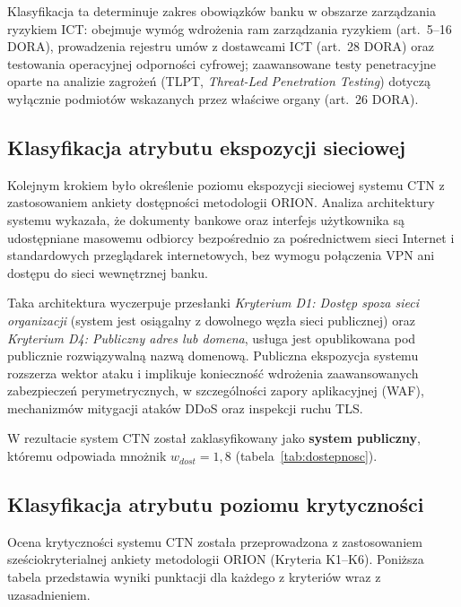 Klasyfikacja ta determinuje zakres obowiązków banku w obszarze zarządzania ryzykiem ICT: obejmuje wymóg wdrożenia ram zarządzania ryzykiem (art.~5--16 DORA), prowadzenia rejestru umów z dostawcami ICT (art.~28 DORA) oraz testowania operacyjnej odporności cyfrowej; zaawansowane testy penetracyjne oparte na analizie zagrożeń (TLPT, \textit{Threat-Led Penetration Testing}) dotyczą wyłącznie podmiotów wskazanych przez właściwe organy (art.~26 DORA).

\subsection{Klasyfikacja atrybutu ekspozycji sieciowej}

Kolejnym krokiem było określenie poziomu ekspozycji sieciowej systemu CTN z zastosowaniem ankiety dostępności metodologii ORION. Analiza architektury systemu wykazała, że dokumenty bankowe oraz interfejs użytkownika są udostępniane masowemu odbiorcy bezpośrednio za pośrednictwem sieci Internet i standardowych przeglądarek internetowych, bez wymogu połączenia VPN ani dostępu do sieci wewnętrznej banku.

Taka architektura wyczerpuje przesłanki \textit{Kryterium D1: Dostęp spoza sieci organizacji} (system jest osiągalny z dowolnego węzła sieci publicznej) oraz \textit{Kryterium D4: Publiczny adres lub domena}, usługa jest opublikowana pod publicznie rozwiązywalną nazwą domenową. Publiczna ekspozycja systemu rozszerza wektor ataku i implikuje konieczność wdrożenia zaawansowanych zabezpieczeń perymetrycznych, w szczególności zapory aplikacyjnej (WAF), mechanizmów mitygacji ataków DDoS oraz inspekcji ruchu TLS.

W rezultacie system CTN został zaklasyfikowany jako \textbf{system publiczny}, któremu odpowiada mnożnik $w_{dost} = 1{,}8$ (tabela~\ref{tab:dostepnosc}).

\subsection{Klasyfikacja atrybutu poziomu krytyczności}

Ocena krytyczności systemu CTN została przeprowadzona z zastosowaniem sześciokryterialnej ankiety metodologii ORION (Kryteria K1--K6). Poniższa tabela przedstawia wyniki punktacji dla każdego z kryteriów wraz z uzasadnieniem.

